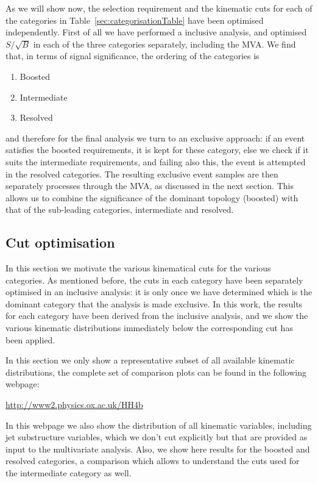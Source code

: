 As we will show now, the selection requirement and the kinematic cuts
for each of the categories in Table~\ref{sec:categorisationTable} have
been optimised independently.
%
First of all we have performed a inclusive analysis, and optimised
$S/\sqrt{B}$ in each of the three categories separately, including
the MVA.
%
We find that, in terms of signal significance, the ordering of
the categories is
\begin{enumerate}
\item Boosted 
\item Intermediate
  \item Resolved
  \end{enumerate}
and therefore for the final analysis we turn to an exclusive approach:
if an event satisfies the boosted requirements, it is kept for
these category, else we check if it suits the intermediate
requirements, and failing also this, the event is attempted
in the resolved categories.
%
The resulting exclusive event samples are then separately processes
through the MVA, as discussed in the next section.
%
This allows us to combine the significance of the dominant topology
(boosted) with that of the sub-leading categories, intermediate
and resolved.

\subsection{Cut optimisation}

In this section we motivate the various
kinematical cuts for the various categories.
%
As mentioned before, the cuts in each category have been separately
optimised in an inclusive analysis: it is only once we have determined
which is the dominant category that the analysis is made exclusive.
%
In this work, the results for each category have been derived
from the inclusive analysis,
and we show the various kinematic distributions immediately
below the corresponding cut has been applied.

In this section we only show a representative subset of
all available kinematic distributions, the complete
set of comparison plots can be found in the following
webpage:
\begin{center}
\url{http://www2.physics.ox.ac.uk/HH4b}
  \end{center}
In this webpage we also show the distribution of all
kinematic variables, including jet substructure variables,
which we don't cut explicitly but that are provided as
input to the multivariate analysis.
%
Also, we show here results for the boosted and resolved categories,
a comparison which allows to understand the cuts used for the
intermediate category as well.

